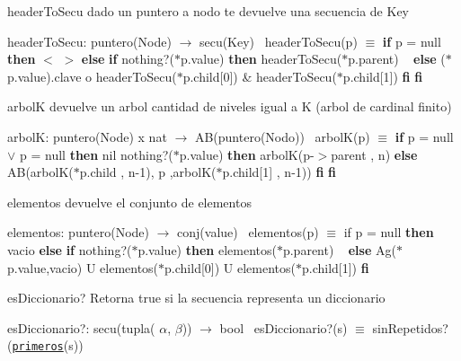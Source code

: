 \begin{DoxyParagraph}{header\+To\+Secu}
dado un puntero a nodo te devuelve una secuencia de Key

header\+To\+Secu\+: puntero(\+Node) $\to$ secu(\+Key)~\newline
 header\+To\+Secu(p) $\equiv$ {\bfseries if} p = null {\bfseries then} $<$ $>$ {\bfseries else} {\bfseries if} nothing?($\ast$p.value) {\bfseries then} header\+To\+Secu($\ast$p.parent) ~\newline
 {\bfseries else} ($\ast$p.value).clave o header\+To\+Secu($\ast$p.child\mbox{[}0\mbox{]}) \& header\+To\+Secu($\ast$p.child\mbox{[}1\mbox{]}) {\bfseries fi} {\bfseries fi} 
\end{DoxyParagraph}


\begin{DoxyParagraph}{arbolK}
devuelve un arbol cantidad de niveles igual a K (arbol de cardinal finito)

arbolK\+: puntero(\+Node) x nat $\to$ A\+B(puntero(\+Nodo))~\newline
 arbol\+K(p) $\equiv$ {\bfseries if} p = null $\lor$ p = null {\bfseries then} nil  nothing?($\ast$p.value) {\bfseries then} arbolK(p-\/$>$parent , n) {\bfseries else} ~\newline
 AB(arbolK($\ast$p.child , n-\/1), p ,arbolK($\ast$p.child\mbox{[}1\mbox{]} , n-\/1)) {\bfseries fi} {\bfseries fi} 
\end{DoxyParagraph}


\begin{DoxyParagraph}{elementos}
devuelve el conjunto de elementos

elementos\+: puntero(\+Node) $\to$ conj(value)~\newline
 elementos(p) $\equiv$ if p = null {\bfseries then} vacio {\bfseries else} {\bfseries if} nothing?($\ast$p.value) {\bfseries then} elementos($\ast$p.parent) ~\newline
 {\bfseries else} Ag($\ast$p.value,vacio) U elementos($\ast$p.child\mbox{[}0\mbox{]}) U elementos($\ast$p.child\mbox{[}1\mbox{]}) {\bfseries fi} 
\end{DoxyParagraph}


\begin{DoxyParagraph}{es\+Diccionario?}
Retorna true si la secuencia representa un diccionario

es\+Diccionario?\+: secu(tupla( $\alpha$, $\beta$)) $\to$ bool~\newline
 es\+Diccionario?(s) $\equiv$ sin\+Repetidos?(\href{axiomas.html#primeros}{\tt primeros}(s)) 
\end{DoxyParagraph}


